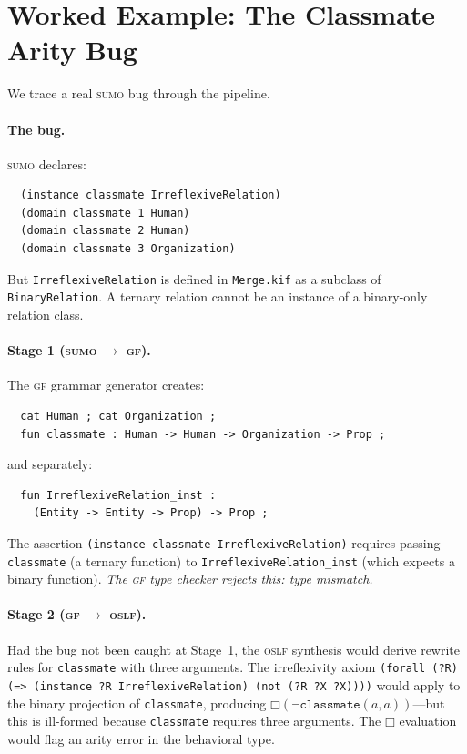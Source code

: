 \documentclass[11pt]{article}
\newcommand{\BoxOp}{\mathbin{\Box}}
\newcommand{\SUMO}{\textsc{sumo}}
\newcommand{\GF}{\textsc{gf}}
\newcommand{\OSLF}{\textsc{oslf}}
\theoremstyle{definition}
\theoremstyle{plain}
\begin{document}
\section{Worked Example: The Classmate Arity Bug}
\label{sec:example}

We trace a real \SUMO{} bug through the pipeline.

\paragraph{The bug.}
\SUMO{} declares:
\begin{verbatim}
  (instance classmate IrreflexiveRelation)
  (domain classmate 1 Human)
  (domain classmate 2 Human)
  (domain classmate 3 Organization)
\end{verbatim}
But \texttt{IrreflexiveRelation} is defined in \texttt{Merge.kif} as
a subclass of \texttt{BinaryRelation}.  A ternary relation cannot be
an instance of a binary-only relation class.

\paragraph{Stage 1 (\SUMO{} $\to$ \GF{}).}
The \GF{} grammar generator creates:
\begin{verbatim}
  cat Human ; cat Organization ;
  fun classmate : Human -> Human -> Organization -> Prop ;
\end{verbatim}
and separately:
\begin{verbatim}
  fun IrreflexiveRelation_inst :
    (Entity -> Entity -> Prop) -> Prop ;
\end{verbatim}
The assertion \texttt{(instance classmate IrreflexiveRelation)} requires
passing \texttt{classmate} (a ternary function) to
\texttt{IrreflexiveRelation\_inst} (which expects a binary function).
\emph{The \GF{} type checker rejects this: type mismatch.}

\paragraph{Stage 2 (\GF{} $\to$ \OSLF{}).}
Had the bug not been caught at Stage~1, the \OSLF{} synthesis would
derive rewrite rules for \texttt{classmate} with three arguments.
The irreflexivity axiom
\texttt{(forall (?R) (=> (instance ?R IrreflexiveRelation) (not (?R ?X ?X))))}
would apply to the binary projection of \texttt{classmate}, producing
$\BoxOp(\neg\texttt{classmate}(a,a))$---but this is ill-formed because
\texttt{classmate} requires three arguments.
The $\BoxOp$ evaluation would flag an arity error in the behavioral
type.
\end{document}
